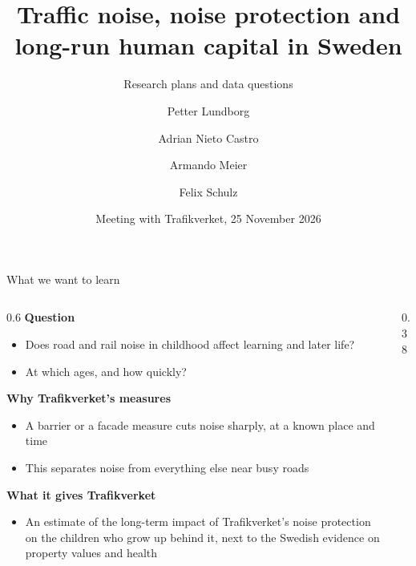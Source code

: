 \documentclass[aspectratio=169, 10pt]{beamer}
\title{Traffic noise, noise protection and long-run human capital in Sweden}
\subtitle{Research plans and data questions}
\author{Petter Lundborg \and Adrian Nieto Castro \and Armando Meier \and Felix Schulz}
\institute{Lund University \quad University of Basel}
\date{Meeting with Trafikverket, 25 November 2026}
\newcommand{\house}[3][black!45]{%
  \fill[#1] (#2-0.17,#3) rectangle (#2+0.17,#3+0.25);
  \fill[#1] (#2-0.22,#3+0.25) -- (#2,#3+0.43) -- (#2+0.22,#3+0.25) -- cycle;}
\begin{document}
\maketitle

\begin{frame}{What we want to learn}
\begin{columns}[T]
\begin{column}{0.6\textwidth}
\small
\textbf{Question}
\begin{itemize}\setlength{\itemsep}{0pt}
  \item Does road and rail noise in childhood affect learning and later life?
  \item At which ages, and how quickly?
\end{itemize}

\smallskip
\textbf{Why Trafikverket's measures}
\begin{itemize}\setlength{\itemsep}{0pt}
  \item A barrier or a facade measure cuts noise sharply, at a known place and time
  \item This separates noise from everything else near busy roads
\end{itemize}

\smallskip
\textbf{What it gives Trafikverket}
\begin{itemize}\setlength{\itemsep}{0pt}
  \item An estimate of the long-term impact of Trafikverket's noise protection on the children
    who grow up behind it, next to the Swedish evidence on property values and health
    \parencite{lindgrenSoundInvestmentTraffic2021,lindgrenSoundEnvironmentHealth2021}
\end{itemize}
\end{column}
\begin{column}{0.38\textwidth}
\centering
\vspace{1.2em}
\end{column}
\end{columns}
\end{frame}
\end{document}

